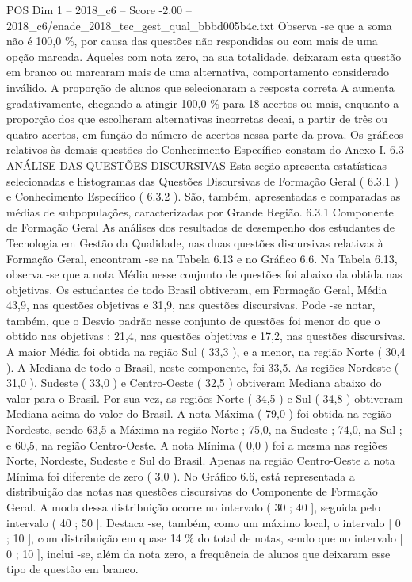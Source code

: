 \begin{textsample}{POS Dim 1 – 2018\_c6 – Score -2.00 – 2018\_c6/enade\_2018\_tec\_gest\_qual\_bbbd005b4c.txt}
Observa -se que a soma não é 100,0 \%, por causa das questões não respondidas ou com mais de uma opção marcada.
Aqueles com nota zero, na sua totalidade, deixaram esta questão em branco ou marcaram mais de uma alternativa, comportamento considerado inválido.
A proporção de alunos que selecionaram a resposta correta A aumenta gradativamente, chegando a atingir 100,0 \% para 18 acertos ou mais, enquanto a proporção dos que escolheram alternativas incorretas decai, a partir de três ou quatro acertos, em função do número de acertos nessa parte da prova.
Os gráficos relativos às demais questões do Conhecimento Específico constam do Anexo I. 6.3 ANÁLISE DAS QUESTÕES DISCURSIVAS Esta seção apresenta estatísticas selecionadas e histogramas das Questões Discursivas de Formação Geral ( 6.3.1 ) e Conhecimento Específico ( 6.3.2 ).
São, também, apresentadas e comparadas as médias de subpopulações, caracterizadas por Grande Região. 6.3.1 Componente de Formação Geral As análises dos resultados de desempenho dos estudantes de Tecnologia em Gestão da Qualidade, nas duas questões discursivas relativas à Formação Geral, encontram -se na Tabela 6.13 e no Gráfico 6.6.
Na Tabela 6.13, observa -se que a nota Média nesse conjunto de questões foi abaixo da obtida nas objetivas.
Os estudantes de todo Brasil obtiveram, em Formação Geral, Média 43,9, nas questões objetivas e 31,9, nas questões discursivas.
Pode -se notar, também, que o Desvio padrão nesse conjunto de questões foi menor do que o obtido nas objetivas : 21,4, nas questões objetivas e 17,2, nas questões discursivas.
A maior Média foi obtida na região Sul ( 33,3 ), e a menor, na região Norte ( 30,4 ).
A Mediana de todo o Brasil, neste componente, foi 33,5.
As regiões Nordeste ( 31,0 ), Sudeste ( 33,0 ) e Centro-Oeste ( 32,5 ) obtiveram Mediana abaixo do valor para o Brasil.
Por sua vez, as regiões Norte ( 34,5 ) e Sul ( 34,8 ) obtiveram Mediana acima do valor do Brasil.
A nota Máxima ( 79,0 ) foi obtida na região Nordeste, sendo 63,5 a Máxima na região Norte ; 75,0, na Sudeste ; 74,0, na Sul ; e 60,5, na região Centro-Oeste.
A nota Mínima ( 0,0 ) foi a mesma nas regiões Norte, Nordeste, Sudeste e Sul do Brasil.
Apenas na região Centro-Oeste a nota Mínima foi diferente de zero ( 3,0 ).
No Gráfico 6.6, está representada a distribuição das notas nas questões discursivas do Componente de Formação Geral.
A moda dessa distribuição ocorre no intervalo ( 30 ; 40 ], seguida pelo intervalo ( 40 ; 50 ].
Destaca -se, também, como um máximo local, o intervalo [ 0 ; 10 ], com distribuição em quase 14 \% do total de notas, sendo que no intervalo [ 0 ; 10 ], inclui -se, além da nota zero, a frequência de alunos que deixaram esse tipo de questão em branco.

\end{textsample}
